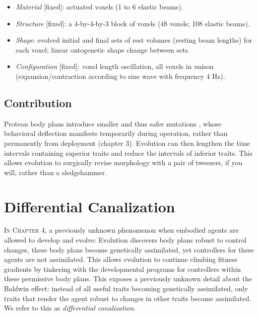 \begin{itemize}
    \item \textit{Material} [fixed]: actuated voxels (1 to 6 elastic beams).
    \item \textit{Structure} [fixed]: a 4-by-4-by-3 block of voxels (48 voxels; 108 elastic beams).
    \item \textit{Shape}: evolved initial and final sets of rest volumes (resting beam lengths) for each voxel; linear ontogenetic shape change between sets.
    \item \textit{Configuration} [fixed]: voxel length oscillation, all voxels in unison (expansion/contraction according to sine wave with frequency 4 Hz).
\end{itemize}


\subsection{Contribution}


Protean body plans introduce smaller and thus safer mutations \cite{lehman2018safe}, whose behavioral deflection manifests temporarily during operation, rather than permanently from deployment (chapter 3).
Evolution can then lengthen the time intervals containing superior traits and reduce the intervals of inferior traits.
This allows evolution to surgically revise morphology with a pair of tweezers, if you will, rather than a sledgehammer.






\section{Differential Canalization}

\textsc{In Chapter 4,}
a previously unknown phenomenon when embodied agents are allowed to develop and evolve: Evolution discovers body plans robust to control changes, these body plans become genetically assimilated, yet controllers for these agents are not assimilated. 
This allows evolution to continue climbing fitness gradients by tinkering with the developmental programs for controllers within these permissive body plans. 
This exposes a previously unknown detail about the Baldwin effect: instead of all useful traits becoming genetically assimilated, only traits that render the agent robust to changes in other traits become assimilated. 
We refer to this as \textit{differential canalization}.


